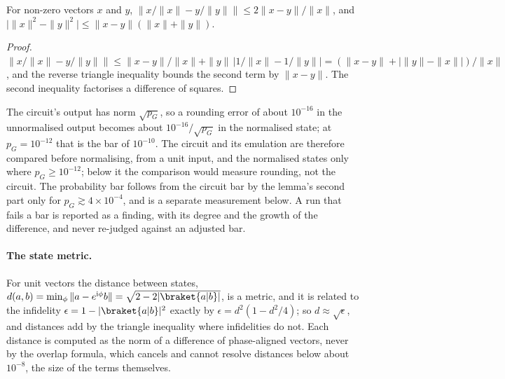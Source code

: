 \begin{lemma}
\label{lem:normalising}
For non-zero vectors $x$ and $y$, $\bigl\|x/\|x\|-y/\|y\|\bigr\|\le2\|x-y\|/\|x\|$, and $\bigl|\|x\|^2-\|y\|^2\bigr|\le\|x-y\|(\|x\|+\|y\|)$.
\end{lemma}
\begin{proof}
$\bigl\|x/\|x\|-y/\|y\|\bigr\|\le\|x-y\|/\|x\|+\|y\|\,\bigl|1/\|x\|-1/\|y\|\bigr|=(\|x-y\|+|\|y\|-\|x\||)/\|x\|$, and the reverse triangle inequality bounds the second term by $\|x-y\|$. The second inequality factorises a difference of squares.
\end{proof}

The circuit's output has norm $\sqrt{p_G}$, so a rounding error of about $10^{-16}$ in the unnormalised output becomes about $10^{-16}/\sqrt{p_G}$ in the normalised state; at $p_G=10^{-12}$ that is the bar of $10^{-10}$. The circuit and its emulation are therefore compared before normalising, from a unit input, and the normalised states only where $p_G\ge10^{-12}$; below it the comparison would measure rounding, not the circuit. The probability bar follows from the circuit bar by the lemma's second part only for $p_G\gtrsim4\times10^{-4}$, and is a separate measurement below. A run that fails a bar is reported as a finding, with its degree and the growth of the difference, and never re-judged against an adjusted bar.

\paragraph{The state metric.} For unit vectors the distance between states, $d(a,b)=\min_\phi\|a-e^{\mathrm{i}\phi}b\|=\sqrt{2-2|\braket{a|b}|}$, is a metric, and it is related to the infidelity $\epsilon=1-|\braket{a|b}|^2$ exactly by $\epsilon=d^2(1-d^2/4)$; so $d\approx\sqrt\epsilon$, and distances add by the triangle inequality where infidelities do not. Each distance is computed as the norm of a difference of phase-aligned vectors, never by the overlap formula, which cancels and cannot resolve distances below about $10^{-8}$, the size of the terms themselves.

